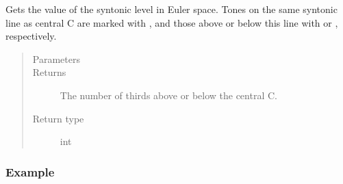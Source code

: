 \documentclass[letterpaper,10pt,english]{sphinxmanual}
\begin{document}
\begin{fulllineitems}
\begin{fulllineitems}
\sphinxAtStartPar
Gets the value of the syntonic level in Euler space.
Tones on the same syntonic line as central C are marked with \sphinxtitleref{\_},
and those above or below this line with  or \sphinxtitleref{,}, respectively.
\begin{quote}\begin{description}
\item[{Parameters}] \leavevmode
\sphinxAtStartPar
{} \textendash{} 

\item[{Returns}] \leavevmode
\sphinxAtStartPar
The number of thirds above or below the central C.

\item[{Return type}] \leavevmode
\sphinxAtStartPar
int

\end{description}\end{quote}
\subsubsection*{Example}

\begin{sphinxVerbatim}[commandchars=\\\{\}]
   
   
   
  
\end{sphinxVerbatim}

\end{fulllineitems}


\end{fulllineitems}
\end{document}

